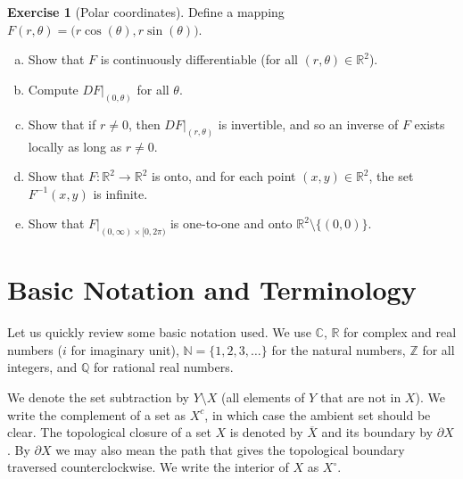 \documentclass[12pt,openany]{book}
\newcommand{\widebar}[1]{\overline{#1}}
\newcommand{\glsadd}[2][]{}
\newcommand{\C}{{\mathbb{C}}}
\newcommand{\R}{{\mathbb{R}}}
\newcommand{\Z}{{\mathbb{Z}}}
\newcommand{\N}{{\mathbb{N}}}
\newcommand{\Q}{{\mathbb{Q}}}
\theoremstyle{plain}
\theoremstyle{remark}
\theoremstyle{definition}
\newenvironment{exbox}{%
    \def\FrameCommand{\vrule width 1pt \relax\hspace{10pt}}%
    \MakeFramed{\advance\hsize-\width\FrameRestore}%
}{%
    \endMakeFramed
}
\newenvironment{exparts}{%
    \leavevmode\begin{enumerate}[a),noitemsep,topsep=0pt,parsep=0pt,partopsep=0pt]
}{%
    \end{enumerate}
}
\theoremstyle{exercise}
\newtheorem{exercise}{Exercise}[section]
\theoremstyle{example}
\begin{document}
\begin{exbox}
\begin{exercise}[Polar coordinates]%
\label{mv:exercise:polarcoordinates}
\pagebreak[3]
Define a mapping $F(r,\theta) = \bigl(r \cos(\theta), r \sin(\theta) \bigr)$.
\begin{exparts}
\item
Show that $F$ is continuously differentiable (for all $(r,\theta) \in
\R^2$).
\item
Compute $DF|_{(0,\theta)}$ for all $\theta$.
\item
Show that if $r \neq 0$, then $DF|_{(r,\theta)}$ is invertible, and so an
inverse of $F$ exists locally as long as $r \neq 0$.
\item
Show that $F \colon \R^2 \to \R^2$ is onto, and for each point $(x,y) \in
\R^2$, the set $F^{-1}(x,y)$ is infinite.
\item
Show that $F|_{(0,\infty) \times [0,2\pi)}$ is one-to-one and onto
$\R^2 \setminus \bigl\{ (0,0) \bigr\}$.
\end{exparts}
\end{exercise}
\end{exbox}


\chapter{Basic Notation and Terminology} \label{ap:basicnotation}


Let us quickly review some basic notation used.
We use $\C$, $\R$ for complex and real numbers ($i$ for imaginary unit),
$\N = \{ 1,2,3, \ldots \}$ for the natural numbers,
$\Z$ for all integers, and $\Q$ for rational real numbers.

\glsadd{not:setminus}%
We denote the set subtraction by 
$Y \setminus X$ (all elements of
$Y$ that are not in $X$).
\glsadd{not:complement}%
We write the complement of a set as $X^c$, in which case
the ambient set should be clear.
\glsadd{not:closure}%
The topological closure of a set $X$ is denoted by $\widebar{X}$ and its
boundary by
\glsadd{not:boundary}%
$\partial X$.  By $\partial X$ we may also mean the path that gives the
topological boundary traversed counterclockwise.
We write the interior of $X$ as
\glsadd{not:interior}%
$X^\circ$.
\end{document}
